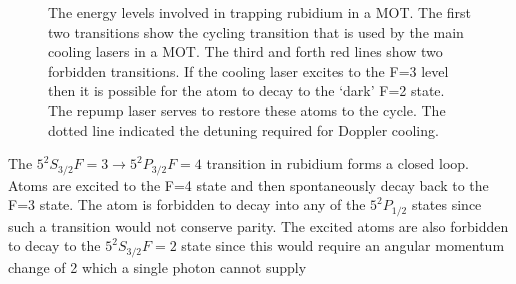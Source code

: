 \begin{figure}
\centering
\hspace{10pt}
\caption[Title]{The energy levels involved in trapping rubidium in a MOT. The first two transitions show the cycling transition that is used by the main cooling lasers in a MOT. The third and forth red lines show two forbidden transitions. If the cooling laser excites to the F=3 level then it is possible for the atom to decay to the `dark' F=2 state. The repump laser serves to restore these atoms to the cycle. The dotted line indicated the detuning required for Doppler cooling.}
\label{fig:energy_levels}
\end{figure}

The $5 ^2 S_{3/2} F=3\rightarrow5 ^2 P_{3/2} F=4$ transition in rubidium forms a closed loop. Atoms are excited to the F=4 state and then spontaneously decay back to the F=3 state. The atom is forbidden to decay into any of the $5 ^2 P_{1/2}$ states since such a transition would not conserve parity. The excited atoms are also forbidden to decay to the $5 ^2 S_{3/2} F=2$ state since this would require an angular momentum change of 2 which a single photon cannot supply

